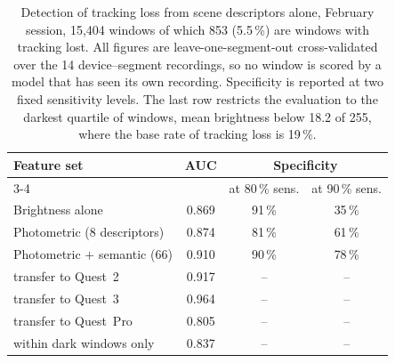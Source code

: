 \begin{table}[t]
\caption{Detection of tracking loss from scene descriptors alone, February session, 15,404 windows of which 853 (5.5\,\%) are windows with tracking lost. All figures are leave-one-segment-out cross-validated over the 14 device--segment recordings, so no window is scored by a model that has seen its own recording. Specificity is reported at two fixed sensitivity levels. The last row restricts the evaluation to the darkest quartile of windows, mean brightness below 18.2 of 255, where the base rate of tracking loss is 19\,\%.}\label{tab:detector}
\begin{tabular}{lccc}
\toprule
Feature set & AUC & \multicolumn{2}{c}{Specificity} \\
\cmidrule(l){3-4}
 & & at 80\,\% sens. & at 90\,\% sens. \\
\midrule
Brightness alone & 0.869 & 91\,\% & 35\,\% \\
Photometric (8 descriptors) & 0.874 & 81\,\% & 61\,\% \\
Photometric $+$ semantic (66) & 0.910 & 90\,\% & 78\,\% \\
\addlinespace
\quad transfer to Quest~2 & 0.917 & -- & -- \\
\quad transfer to Quest~3 & 0.964 & -- & -- \\
\quad transfer to Quest~Pro & 0.805 & -- & -- \\
\quad within dark windows only & 0.837 & -- & -- \\
\bottomrule
\end{tabular}
\end{table}